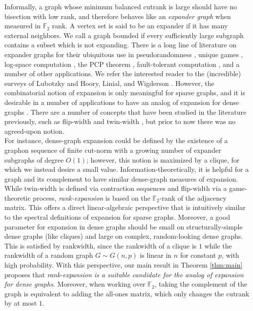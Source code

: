 \documentclass{article}
\theoremstyle{definition}
\begin{document}
Informally, a graph whose minimum balanced cutrank is large should have no bisection with low rank, and therefore behaves like an \emph{expander graph} when measured in $\mathbb{F}_2$ rank. A vertex set is said to be an expander if it has many external neighbors. We call a graph bounded if every sufficiently large subgraph contains a subset which is not expanding.  There is a long line of literature on expander graphs for their ubiquitous use in pseudorandomness \cite{Alon1986Eigenvalues,anand2025pseudorandomnessstickyrandomwalk,golowich_et_al:LIPIcs.CCC.2022.27,anand2025pseudorandomnessexpanderrandomwalks}, unique games \cite{bafna2021highdimensionalexpanderseigenstripping}, log-space computation \cite{Reingold2008}, the PCP theorem \cite{10.1145/1236457.1236459}, fault-tolerant computation \cite{AjtaiAlonBruckEtAl1992,chaudhari2025peer}, and a number of other applications. We refer the interested reader to the (incredible) surveys of Lubotzky \cite{lubotzky2011expandergraphspureapplied} and Hoory, Linial, and Wigderson \cite{Hoory2006}.  However, the combinatorial notion of expansion is only meaningful for sparse graphs, and it is desirable in a number of applications to have an analog of expansion for dense graphs \cite{alon2003densegraphsantimagic, alon1992almost, doi:10.1137/18M122039X, 10.1016/0012-365X(95)00242-O, Alon_Nachmias_Shalev_2022, alon1998packing, srivastava2017alonboppanatypeboundweighted}. There are a number of concepts that have been studied in the literature previously, such as flip-width \cite{K_hn_2014,toruńczyk2024flipwidthcopsrobberdense} and twin-width \cite{bonnet2022}, but prior to now there was no agreed-upon notion.\\ 
 
For instance, dense-graph expansion could be defined by the existence of a graphon sequence of finite cut-norm with a growing number of expander subgraphs of degree $O(1)$; however, this notion is maximized by a clique, for which we instead desire a small value. Information-theoretically, it is helpful for a graph and its complement to have similar dense-graph measures of expansion.  While twin-width is defined via contraction sequences and flip-width via a game-theoretic process, \emph{rank-expansion} is based on the $\mathbb{F}_2$-rank of the adjacency matrix. 
This offers a direct linear-algebraic perspective that is intuitively similar to the spectral definitions of expansion for sparse graphs. Moreover, a good parameter for expansion in dense graphs should be small on structurally-simple dense graphs (like cliques) and large on complex, random-looking dense graphs. This is satisfied by rankwidth, since the rankwidth of a clique is $1$ while the rankwidth of a random graph $G\sim G(n,p)$ is linear in $n$ for constant $p$, with high probability. With this perspective, our main result in Theorem \ref{thm:main} proposes that \emph{rank-expansion is a suitable candidate for the analog of expansion for dense graphs}. Moreover, when working over $\mathbb{F}_2$, taking the complement of the graph is equivalent to adding the all-ones matrix, which only changes the cutrank by at most $1$.
\end{document}
